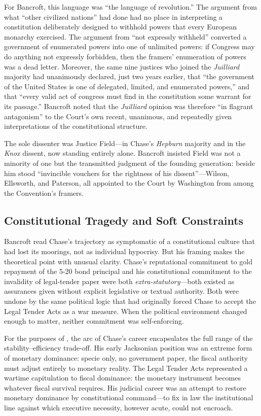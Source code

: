 \documentclass[12pt]{article}
\begin{document}
For Bancroft, this language was ``the language of revolution.''
The argument from what ``other civilized nations'' had done had no place
in interpreting a constitution deliberately designed to withhold powers
that every European monarchy exercised.  The argument from ``not
expressly withheld'' converted a government of enumerated powers into
one of unlimited powers: if Congress may do anything not expressly
forbidden, then the framers' enumeration of powers was a
dead letter.  Moreover, the same nine justices who joined the
\textit{Juilliard} majority had unanimously declared, just two years
earlier, that ``the government of the United States is one of delegated,
limited, and enumerated powers,'' and that ``every valid act of congress
must find in the constitution some warrant for its passage.''  Bancroft
noted that the \textit{Juilliard} opinion was therefore ``in
flagrant antagonism'' to the Court's own recent, unanimous, and
repeatedly given interpretations of the constitutional structure.

The sole dissenter was Justice Field---in Chase's \textit{Hepburn}
majority and in the \textit{Knox} dissent, now standing entirely alone.
Bancroft insisted Field was not a minority of one but the transmitted
judgment of the founding generation: beside him stood ``invincible
vouchers for the rightness of his dissent''---Wilson, Ellsworth, and
Paterson, all appointed to the Court by Washington from among the
Convention's framers.

\subsection{Constitutional Tragedy and Soft Constraints}

Bancroft read Chase's trajectory as symptomatic of a constitutional
culture that had lost its moorings, not as individual hypocrisy.  But his framing makes
the theoretical point with unusual clarity.  Chase's reputational
commitment to gold repayment of the 5-20 bond principal and his
constitutional commitment to the invalidity of legal-tender paper were
both \textit{extra-statutory}---both existed as assurances given without
explicit legislative or textual authority.  Both were undone by the same
political logic that had originally forced Chase to accept the Legal
Tender Acts as a war measure.  When the political environment changed
enough to matter, neither commitment was self-enforcing.

For the purposes of \citet{Sargent2011}, the arc of Chase's career
encapsulates the full range of the stability--efficiency trade-off.  His
early Jacksonian position was an extreme form of monetary dominance:
specie only, no government paper, the fiscal authority must adjust
entirely to monetary reality.  The Legal Tender Acts represented a
wartime capitulation to fiscal dominance: the monetary instrument
becomes whatever fiscal survival requires.  His judicial career was an
attempt to restore monetary dominance by constitutional command---to fix
in law the institutional line against which executive necessity, however
acute, could not encroach.
\end{document}
